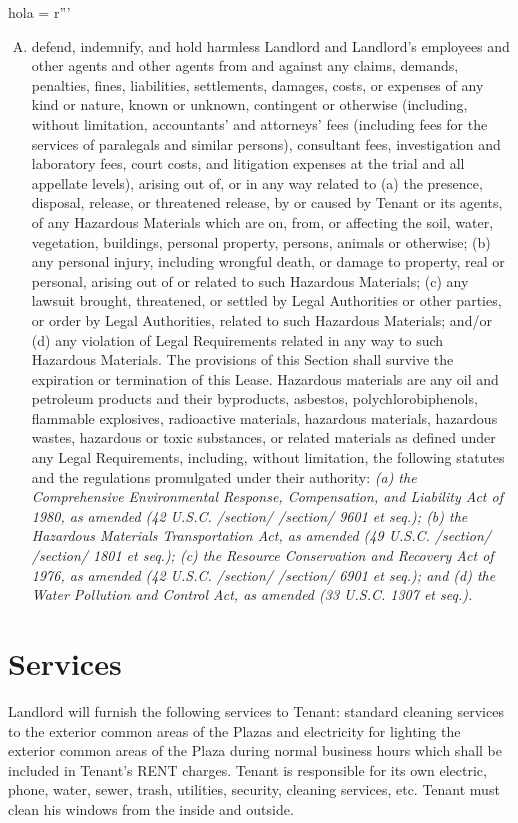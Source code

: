 hola = r'''\documentclass{article}
\begin{document}
\begin{minipage}{\textwidth}
\begin{enumerate}[(A)]
    \item	defend, indemnify, and hold harmless Landlord and Landlord's employees and other agents and other agents from and against any claims, demands, penalties, fines, liabilities, settlements, damages, costs, or expenses of any kind or nature, known or unknown, contingent or otherwise (including, without limitation, accountants' and attorneys' fees (including fees for the services of paralegals and similar persons), consultant fees, investigation and laboratory fees, court costs, and litigation expenses at the trial and all appellate levels), arising out of, or in any way related to (a) the presence, disposal, release, or threatened release, by or caused by Tenant or its agents, of any Hazardous Materials which are on, from, or affecting the soil, water, vegetation, buildings, personal property, persons, animals or otherwise; (b) any personal injury, including wrongful death, or damage to property, real or personal, arising out of or related to such Hazardous Materials; (c) any lawsuit brought, threatened, or settled by Legal Authorities or other parties, or order by Legal Authorities, related to such Hazardous Materials; and/or (d) any violation of Legal Requirements related in any way to such Hazardous Materials. The provisions of this Section shall survive the expiration or termination of this Lease. Hazardous materials are any oil and petroleum products and their byproducts, asbestos, polychlorobiphenols, flammable explosives, radioactive materials, hazardous materials, hazardous wastes, hazardous or toxic substances, or related materials as defined under any Legal Requirements, including, without limitation, the following statutes and the regulations promulgated under their authority: \emph{(a) the Comprehensive Environmental Response, Compensation, and Liability Act of 1980, as amended (42 U.S.C. /section/ /section/ 9601 et seq.); (b) the Hazardous Materials Transportation Act, as amended (49 U.S.C. /section/ /section/ 1801 et seq.); (c) the Resource Conservation and Recovery Act of 1976, as amended (42 U.S.C. /section/ /section/ 6901 et seq.); and (d) the Water Pollution and Control Act, as amended (33 U.S.C. 1307 et seq.).}
    
    \end{enumerate}
    \end{minipage}
    

\section{Services}
    Landlord will furnish the following services to Tenant:  standard cleaning services to the exterior common areas of the Plazas and electricity for lighting the exterior common areas of the Plaza during normal business hours which shall be included in Tenant's RENT charges.  Tenant is responsible for its own electric, phone, water, sewer, trash, utilities, security, cleaning services, etc.  Tenant must clean his windows from the inside and outside.
\end{document}
